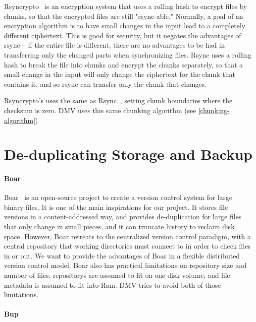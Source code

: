Rsyncrypto~\cite{rsyncrypto_algorithm} is an encryption system that uses a
rolling hash to encrypt files by chunks, so that the encrypted files are still
"rsync-able." Normally, a goal of an encryption algorithm is to have small
changes in the input lead to a completely different ciphertext. This is good for
security, but it negates the advantages of rsync -- if the entire file is
different, there are no advantages to be had in transferring only the changed
parts when synchronizing files. Rsync uses a rolling hash to break the file into
chunks and encrypt the chunks separately, so that a small change in the input
will only change the ciphertext for the chunk that contains it, and so rsync can
transfer only the chunk that changes.

Rsyncrypto's uses the same  as
Rsync~\cite{rsyncrypto_algorithm,rsynctechreport}, setting chunk boundaries where
the checksum is zero. \gls{DMV} uses this same chunking algorithm (see
\autoref{chunking-algorithm}).


\section{De-duplicating Storage and Backup}

\paragraph{Boar}

Boar~\cite{boar_homepage} is an open-source project to create a version control
system for large binary files. It is one of the main inspirations for our
project. It stores file versions in a content-addressed way, and provides
de-duplication for large files that only change in small pieces, and it can
truncate history to reclaim disk space. However, Boar retreats to the
centralized version control paradigm, with a central \gls{repository} that
working directories must connect to in order to check files in or out. We want
to provide the advantages of Boar in a flexible distributed version control
model. Boar also has practical limitations on \gls{repository} size and number
of files. \glspl{repository} are assumed to fit on one disk volume, and file
metadata is assumed to fit into Ram. \gls{DMV} tries to avoid both of those
limitations.


\paragraph{Bup}\label{related_bup}

